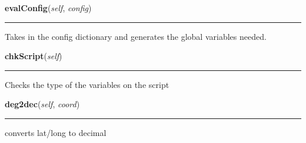     \label{Epigrass:manager:simulate:evalConfig}

    \vspace{0.5ex}

    \begin{boxedminipage}{\textwidth}

    \raggedright \textbf{evalConfig}(\textit{self}, \textit{config})

    \vspace{-1.5ex}

    \rule{\textwidth}{0.5\fboxrule}
    Takes in the config dictionary and generates the global variables 
    needed.

    \vspace{1ex}

    \end{boxedminipage}

    \label{Epigrass:manager:simulate:chkScript}

    \vspace{0.5ex}

    \begin{boxedminipage}{\textwidth}

    \raggedright \textbf{chkScript}(\textit{self})

    \vspace{-1.5ex}

    \rule{\textwidth}{0.5\fboxrule}
    Checks the type of the variables on the script

    \vspace{1ex}

    \end{boxedminipage}

    \label{Epigrass:manager:simulate:deg2dec}

    \vspace{0.5ex}

    \begin{boxedminipage}{\textwidth}

    \raggedright \textbf{deg2dec}(\textit{self}, \textit{coord})

    \vspace{-1.5ex}

    \rule{\textwidth}{0.5\fboxrule}
    converts lat/long to decimal

    \vspace{1ex}

    \end{boxedminipage}

